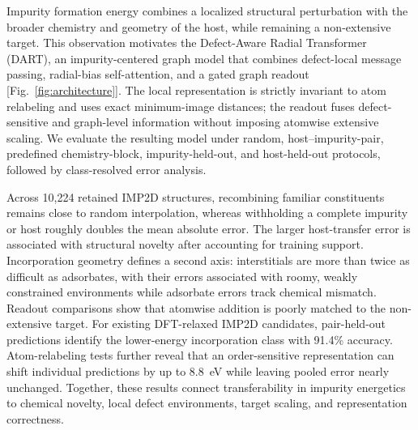 Impurity formation energy combines a localized structural perturbation with
the broader chemistry and geometry of the host, while remaining a
non-extensive target.  This observation motivates the Defect-Aware Radial
Transformer (DART), an impurity-centered graph model that combines defect-local
message passing, radial-bias self-attention, and a gated graph readout
[Fig.~\ref{fig:architecture}].  The local representation is strictly invariant
to atom relabeling and uses exact minimum-image distances; the readout fuses
defect-sensitive and graph-level information without imposing atomwise
extensive scaling.  We evaluate the resulting model under random,
host--impurity-pair, predefined chemistry-block, impurity-held-out, and
host-held-out protocols, followed by class-resolved error analysis.

Across 10,224 retained IMP2D structures, recombining familiar constituents
remains close to random interpolation, whereas withholding a complete impurity
or host roughly doubles the mean absolute error.  The larger host-transfer
error is associated with structural novelty after accounting for training
support.  Incorporation geometry defines a second axis: interstitials are more
than twice as difficult as adsorbates, with their errors associated with roomy,
weakly constrained environments while adsorbate errors track chemical
mismatch.  Readout comparisons show that atomwise addition is poorly matched
to the non-extensive target.  For existing DFT-relaxed IMP2D candidates,
pair-held-out predictions identify the lower-energy incorporation class with
91.4\% accuracy.  Atom-relabeling tests further reveal that an order-sensitive
representation can shift individual predictions by up to 8.8~eV while leaving
pooled error nearly unchanged.  Together, these results connect transferability
in impurity energetics to chemical novelty, local defect environments, target
scaling, and representation correctness.

